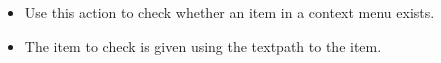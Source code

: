 
\begin{itemize}
\item Use this action to check whether an item in a context menu exists.
\item The item to check is given using the textpath to the item. 
\end{itemize}



